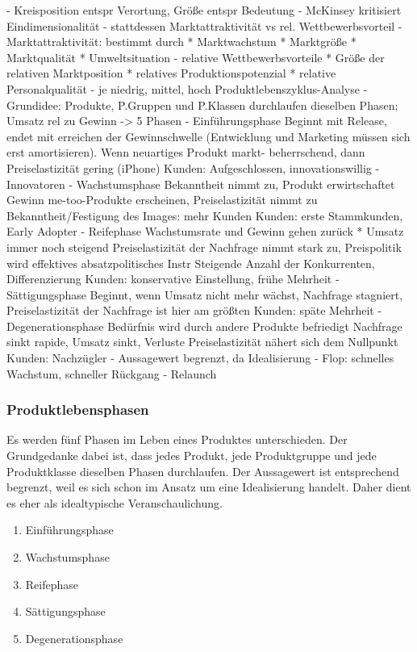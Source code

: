 		- Kreisposition entspr Verortung, Größe entspr Bedeutung
	- McKinsey kritisiert Eindimensionalität
		- stattdessen Marktattraktivität vs rel. Wettbewerbsvorteil
			- Marktattraktivität: bestimmt durch
			 * Marktwachstum
			 * Marktgröße
			 * Marktqualität
			 * Umweltsituation
			- relative Wettbewerbsvorteile
			 * Größe der relativen Marktposition
			 * relatives Produktionspotenzial
			 * relative Personalqualität
		- je niedrig, mittel, hoch
Produktlebenszyklus-Analyse
	- Grundidee: Produkte, P.Gruppen und P.Klassen durchlaufen dieselben
	 Phasen; Umsatz rel zu Gewinn -> 5 Phasen
		- Einführungsphase
			 Beginnt mit Release, endet mit erreichen der
			 Gewinnschwelle (Entwicklung und Marketing müssen sich
			 erst amortisieren). Wenn neuartiges Produkt markt-
			 beherrschend, dann Preiselastizität gering (iPhone)
				Kunden: Aufgeschlossen, innovationswillig
				- Innovatoren
		- Wachstumsphase
			 Bekanntheit nimmt zu, Produkt erwirtschaftet Gewinn
			 me-too-Produkte erscheinen, Preiselastizität nimmt zu
			 Bekanntheit/Festigung des Images: mehr Kunden
				Kunden: erste Stammkunden, Early Adopter
		- Reifephase
			 Wachstumsrate und Gewinn gehen zurück
			 * Umsatz immer noch steigend
			 Preiselastizität der Nachfrage nimmt stark zu,
			 Preispolitik wird effektives absatzpolitisches Instr
			 Steigende Anzahl der Konkurrenten, Differenzierung
				Kunden: konservative Einstellung,
					frühe Mehrheit
		- Sättigungsphase
			 Beginnt, wenn Umsatz nicht mehr wächst, Nachfrage
			 stagniert, Preiselastizität der Nachfrage ist hier am
			 größten
				Kunden: späte Mehrheit
		- Degenerationsphase
			 Bedürfnis wird durch andere Produkte befriedigt
			 Nachfrage sinkt rapide, Umsatz sinkt, Verluste
			 Preiselastizität nähert sich dem Nullpunkt
				Kunden: Nachzügler 
	- Aussagewert begrenzt, da Idealisierung
		- Flop: schnelles Wachstum, schneller Rückgang
		- Relaunch

		\subsubsection{Produktlebensphasen}

Es werden fünf Phasen im Leben eines Produktes unterschieden. Der Grundgedanke dabei ist, dass jedes Produkt, jede Produktgruppe und jede Produktklasse dieselben Phasen durchlaufen. Der Aussagewert ist entsprechend begrenzt, weil es sich schon im Ansatz um eine Idealisierung handelt. Daher dient es eher als idealtypische Veranschaulichung.

\begin{enumerate}
	\item Einführungsphase
	\item Wachstumsphase
	\item Reifephase
	\item Sättigungsphase
	\item Degenerationsphase
\end{enumerate}

